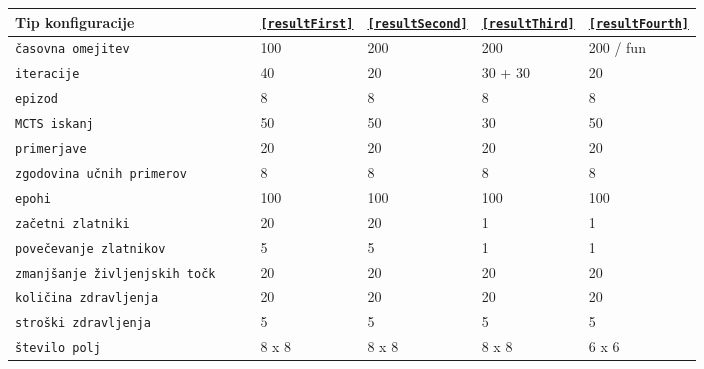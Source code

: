 \documentclass[a4paper, 12pt]{book}
\begin{document}
\begin{table}
	
	\begin{center}
		
		\begin{tabular}{p{0.4\linewidth}|p{0.1\linewidth}|p{0.1\linewidth}|p{0.1\linewidth}|p{0.1\linewidth}}
			Tip konfiguracije                          & {\tt \ref{resultFirst}} & {\tt \ref{resultSecond}} & {\tt \ref{resultThird}} & {\tt \ref{resultFourth}}\\ \hline
			{\tt časovna omejitev}                     & 100                     & 200                      & 200                     & 200 / fun               \\
			{\tt iteracije}                            & 40                      & 20                       & 30 + 30                 & 20                      \\
			{\tt epizod}                               & 8                       & 8                        & 8                       & 8                       \\
			{\tt MCTS iskanj}                          & 50                      & 50                       & 30                      & 50                      \\
			{\tt primerjave}                           & 20                      & 20                       & 20                      & 20                      \\
			{\tt zgodovina učnih primerov}             & 8                       & 8                        & 8                       & 8                       \\
			{\tt epohi}                                & 100                     & 100                      & 100                     & 100                     \\
			{\tt začetni zlatniki}                     & 20                      & 20                       & 1                       & 1                       \\
			{\tt povečevanje zlatnikov}                & 5                       & 5                        & 1                       & 1                       \\
			{\tt zmanjšanje življenjskih točk}         & 20                      & 20                       & 20                      & 20                      \\
			{\tt količina zdravljenja}                 & 20                      & 20                       & 20                      & 20                      \\
			{\tt stroški zdravljenja}                  & 5                       & 5                        & 5                       & 5                       \\
			{\tt število polj}                         & 8 x 8                   & 8 x 8                    & 8 x 8                   & 6 x 6                   \\


\end{tabular}
\end{center}
\end{table}
\end{document}
